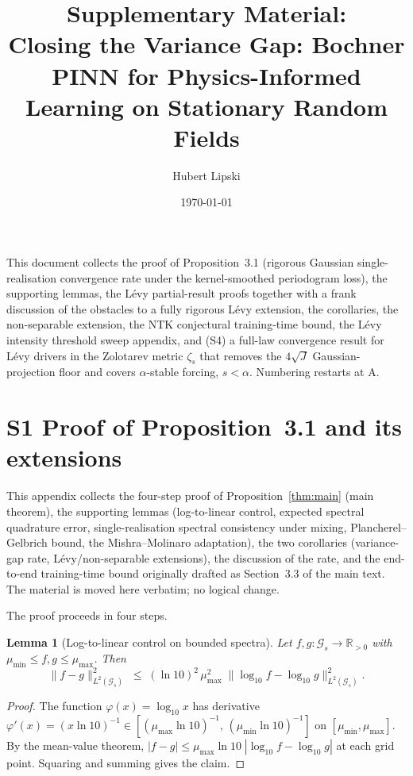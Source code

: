 \documentclass[review,12pt]{elsarticle}
\newtheorem{lemma}{Lemma}
\begin{document}
\title{Supplementary Material:\\ Closing the Variance Gap: Bochner PINN for Physics-Informed Learning on Stationary Random Fields}
\author{Hubert Lipski}
\date{\today}
\maketitle

\noindent This document collects the proof of
Proposition~3.1 (rigorous Gaussian single-realisation convergence
rate under the kernel-smoothed periodogram loss), the supporting
lemmas, the L\'evy partial-result proofs together with a frank
discussion of the obstacles to a fully rigorous L\'evy extension,
the corollaries, the non-separable extension, the NTK conjectural
training-time bound, the L\'evy intensity threshold sweep
appendix, and (S4) a full-law convergence result for L\'evy drivers
in the Zolotarev metric $\zeta_s$ that removes the $4\sqrt J$
Gaussian-projection floor and covers $\alpha$-stable forcing,
$s < \alpha$. Numbering restarts at A.

\appendix

\section*{S1 \quad Proof of Proposition~3.1 and its extensions}
\label{app:convergence-proofs}

This appendix collects the four-step proof of
Proposition~\ref{thm:main} (main theorem), the supporting
lemmas (log-to-linear control, expected spectral quadrature error,
single-realisation spectral consistency under mixing,
Plancherel--Gelbrich bound, the Mishra--Molinaro adaptation), the
two corollaries (variance-gap rate, L\'evy/non-separable extensions),
the discussion of the rate, and the end-to-end training-time bound
originally drafted as Section~3.3 of the main text. The material is
moved here verbatim; no logical change.

The proof proceeds in four steps.

\begin{lemma}[Log-to-linear control on bounded spectra]
\label{lem:log-linear}
Let \(f, g : \mathcal G_s \to \mathbb R_{>0}\) with
\(\mu_{\min} \le f, g \le \mu_{\max}\). Then
\[
\|f - g\|^2_{L^2(\mathcal G_s)}
\;\le\; (\ln 10)^2\,\mu_{\max}^2\;
\|\log_{10} f - \log_{10} g\|^2_{L^2(\mathcal G_s)}.
\]
\end{lemma}
\begin{proof}
The function \(\varphi(x) = \log_{10} x\) has derivative
\(\varphi'(x) = (x \ln 10)^{-1}
\in [(\mu_{\max}\ln 10)^{-1},\, (\mu_{\min}\ln 10)^{-1}]\)
on \([\mu_{\min}, \mu_{\max}]\). By the mean-value theorem,
\(|f - g| \le \mu_{\max}\ln 10\;|\log_{10} f - \log_{10} g|\)
at each grid point. Squaring and summing gives the claim.
\end{proof}
\end{document}
